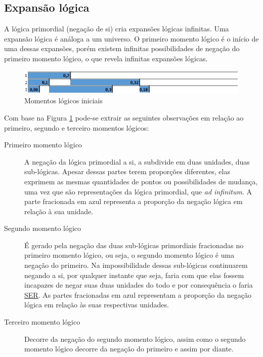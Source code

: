 \subsection{Expansão lógica}
A lógica primordial (negação de si) cria expansões lógicas infinitas. Uma expansão lógica é análoga a um universo. O primeiro momento lógico é o início de uma dessas expansões, porém existem infinitas possibilidades de negação do primeiro momento lógico, o que revela infinitas expansões lógicas.
	\begin{figure}[H]
	\caption{Momentos lógicos iniciais}
	\label{fig:third_logical_moment}
	\centering
	\includegraphics[scale=.85]{sections/images/third_logical_moment.jpg}
	\end{figure}

Com base na Figura \ref{fig:third_logical_moment} pode-se extrair as seguintes observações em relação ao primeiro, segundo e terceiro momentos lógicos:
	\begin{description}
	   \item[Primeiro momento lógico] A negação da lógica primordial a si, a subdivide em duas unidades, duas sub-lógicas. Apesar dessas partes terem proporções diferentes, elas exprimem as mesmas quantidades de pontos ou possibilidades de mudança, uma vez que são representações da lógica primordial, que \textit{ad infinitum}. A parte fracionada em azul representa a proporção da negação lógica em relação à sua unidade.
	   \item[Segundo momento lógico] É gerado pela negação das duas sub-lógicas primordiais fracionadas no primeiro momento lógico, ou seja, o segundo momento lógico é uma negação do primeiro. Na impossibilidade dessas sub-lógicas continuarem negando a si, por qualquer instante que seja, faria com que elas fossem incapazes de negar suas duas unidades do todo e por consequência o faria \underline{SER}. As partes fracionadas em azul representam a proporção da negação lógica em relação às suas respectivas unidades.
	   \item[Terceiro momento lógico] Decorre da negação do segundo momento lógico, assim como o segundo momento lógico decorre da negação do primeiro e assim por diante.
	\end{description}

